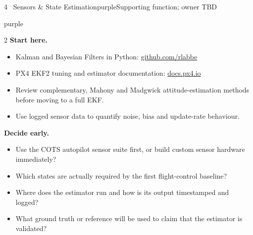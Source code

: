 \documentclass[10pt,a4paper]{article}
\begin{document}
\begin{project}{4 \, Sensors \& State Estimation}{purple}{Supporting function; owner TBD}
\begin{research}{purple}
\smallskip
\begin{multicols}{2}\RaggedRight
\textbf{Start here.}
\begin{itemize}
  \item Kalman and Bayesian Filters in Python: \href{https://github.com/rlabbe/Kalman-and-Bayesian-Filters-in-Python}{github.com/rlabbe}
  \item PX4 EKF2 tuning and estimator documentation: \href{https://docs.px4.io/main/en/advanced_config/tuning_the_ecl_ekf.html}{docs.px4.io}
  \item Review complementary, Mahony and Madgwick attitude-estimation methods before moving to a full EKF.
  \item Use logged sensor data to quantify noise, bias and update-rate behaviour.
\end{itemize}
\columnbreak
\textbf{Decide early.}
\begin{itemize}
  \item Use the COTS autopilot sensor suite first, or build custom sensor hardware immediately?
  \item Which states are actually required by the first flight-control baseline?
  \item Where does the estimator run and how is its output timestamped and logged?
  \item What ground truth or reference will be used to claim that the estimator is validated?
\end{itemize}
\end{multicols}
\end{research}
\end{project}
\end{document}
